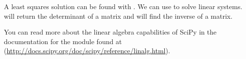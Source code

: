 A least squares solution can be found with .
We can use  to solve linear systems.  
 will return the determinant of a matrix and 
 will find the inverse of a matrix.

You can read more about the linear algebra capabilities of SciPy in the 
documentation for the  module found at
(\url{http://docs.scipy.org/doc/scipy/reference/linalg.html}).

